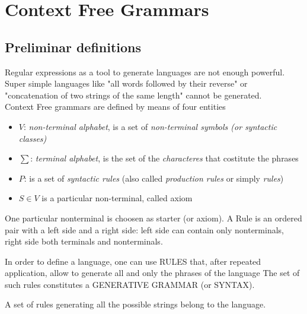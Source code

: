 \chapter{Context Free Grammars}
	\section{Preliminar definitions}
		Regular expressions as a tool to generate languages are not enough powerful. 
		Super simple languages like "all words followed by their reverse" or "concatenation of two strings of the same length" cannot be generated.\\
		Context Free grammars are defined by means of four entities
		\begin{itemize}
			\item $V$: \emph{non-terminal alphabet}, is a set of \emph{non-terminal symbols (or syntactic classes)}
			\item $\sum$: \emph{terminal alphabet}, is the set of the \emph{characteres} that costitute the phrases
			\item $P$: is a set of \emph{syntactic rules} (also called \emph{production rules} or simply \emph{rules})
			\item $S \in V$ is a particular non-terminal, called axiom
		\end{itemize}
		One particular nonterminal is choosen as starter (or axiom).
		A Rule is an ordered pair with a left side and a right side: left side can contain only nonterminals, right side both terminals and nonterminals. 
		
		In order to define a language, one can use RULES that, after repeated application, allow to generate all and only the phrases of the language
		The set of such rules constitutes a GENERATIVE GRAMMAR (or SYNTAX).

		\begin{definition}
			A set of rules generating all the possible strings belong to the language.
		\end{definition}


